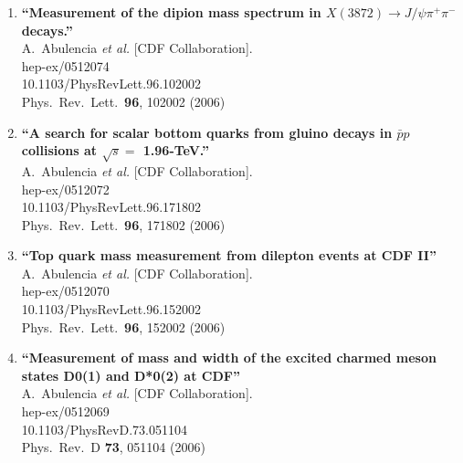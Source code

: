 \documentclass{article}
\begin{document}
\begin{enumerate}
\item%
{\bf ``Measurement of the dipion mass spectrum in $X(3872) \to J/\psi \pi^+ \pi^-$ decays.''}
  \\{}A.~Abulencia {\it et al.}  [CDF Collaboration].
  \\{}hep-ex/0512074
    \\{}10.1103/PhysRevLett.96.102002
\\{}Phys.\ Rev.\ Lett.\  {\bf 96}, 102002 (2006) %


\item%
{\bf ``A search for scalar bottom quarks from gluino decays in $\bar{p}p$ collisions at $\sqrt{s} =$ 1.96-TeV.''}
  \\{}A.~Abulencia {\it et al.}  [CDF Collaboration].
  \\{}hep-ex/0512072
    \\{}10.1103/PhysRevLett.96.171802
\\{}Phys.\ Rev.\ Lett.\  {\bf 96}, 171802 (2006) %


\item%
{\bf ``Top quark mass measurement from dilepton events at CDF II''}
  \\{}A.~Abulencia {\it et al.}  [CDF Collaboration].
  \\{}hep-ex/0512070
    \\{}10.1103/PhysRevLett.96.152002
\\{}Phys.\ Rev.\ Lett.\  {\bf 96}, 152002 (2006) %


\item%
{\bf ``Measurement of mass and width of the excited charmed meson states D0(1) and D*0(2) at CDF''}
  \\{}A.~Abulencia {\it et al.}  [CDF Collaboration].
  \\{}hep-ex/0512069
    \\{}10.1103/PhysRevD.73.051104
\\{}Phys.\ Rev.\ D {\bf 73}, 051104 (2006) %



\end{enumerate}
\end{document}
